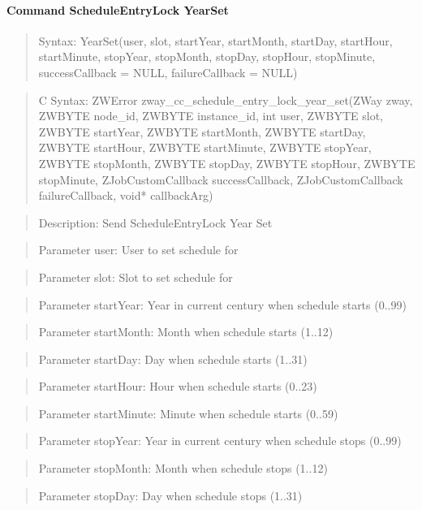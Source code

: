 \paragraph{Command ScheduleEntryLock YearSet}
\begin{quote}Syntax: YearSet(user, slot, startYear, startMonth, startDay, startHour, startMinute, stopYear, stopMonth, stopDay, stopHour, stopMinute, successCallback = NULL, failureCallback = NULL)\end{quote}
\begin{quote}C Syntax: ZWError zway\_cc\_schedule\_entry\_lock\_year\_set(ZWay zway, ZWBYTE node\_id, ZWBYTE instance\_id, int user, ZWBYTE slot, ZWBYTE startYear, ZWBYTE startMonth, ZWBYTE startDay, ZWBYTE startHour, ZWBYTE startMinute, ZWBYTE stopYear, ZWBYTE stopMonth, ZWBYTE stopDay, ZWBYTE stopHour, ZWBYTE stopMinute, ZJobCustomCallback successCallback, ZJobCustomCallback failureCallback, void* callbackArg)\end{quote}
\begin{quote}Description: Send ScheduleEntryLock Year Set\end{quote}
\begin{quote}Parameter user: User to set schedule for\end{quote}
\begin{quote}Parameter slot: Slot to set schedule for\end{quote}
\begin{quote}Parameter startYear: Year in current century when schedule starts (0..99)\end{quote}
\begin{quote}Parameter startMonth: Month when schedule starts (1..12)\end{quote}
\begin{quote}Parameter startDay: Day when schedule starts (1..31)\end{quote}
\begin{quote}Parameter startHour: Hour when schedule starts (0..23)\end{quote}
\begin{quote}Parameter startMinute: Minute when schedule starts (0..59)\end{quote}
\begin{quote}Parameter stopYear: Year in current century when schedule stops (0..99)\end{quote}
\begin{quote}Parameter stopMonth: Month when schedule stops (1..12)\end{quote}
\begin{quote}Parameter stopDay: Day when schedule stops (1..31)\end{quote}
